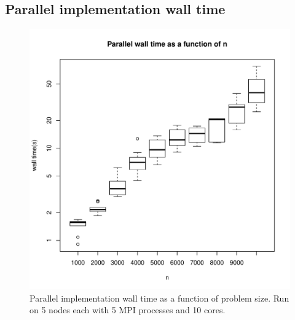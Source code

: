 \documentclass{article}
\begin{document}
\subsection{Parallel implementation wall time}
\begin{figure}[H]
  \begin{center}
    \includegraphics[width=12cm]{../analysis/parallel_walltime1.pdf}
  \end{center}
  \caption{Parallel implementation wall time as a function of problem size. Run on 5 nodes each with 5 MPI processes and 10 cores.}
  \label{parallel_walltime1}
\end{figure}
\end{document}
